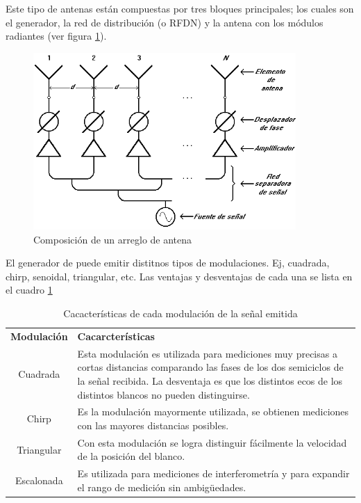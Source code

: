 Este tipo de antenas están compuestas por tres bloques principales; los cuales son el generador, la red de distribución (o RFDN) y la 
antena con los módulos radiantes (ver figura \ref{fig:compositionAntenna}).

\begin{figure}[H]
 \centering
 \includegraphics[width=10cm]{gfx/CompositionAntenna.png}
 \caption{Composición de un arreglo de antena}
 \label{fig:compositionAntenna}
\end{figure}

El generador de puede emitir distitnos tipos de modulaciones. Ej, cuadrada, chirp, senoidal, triangular, etc. Las ventajas y
desventajas de cada una se lista en el cuadro \ref{tab:modulations}

\begin{table}[H]
  \footnotesize
  \centering
  \begin{tabular}{|c|p{9cm}|}
	\hline
	\textbf{Modulación} & \textbf{Cacarcterísticas} \\
	Cuadrada & Esta modulación es utilizada para mediciones muy precisas a cortas distancias comparando las fases de los dos 
	semiciclos de la señal recibida. La desventaja es que los distintos ecos de los distintos blancos no pueden distinguirse.\\\hline
	Chirp & Es la modulación mayormente utilizada, se obtienen mediciones con las mayores distancias posibles.\\\hline
	Triangular & Con esta modulación se logra distinguir fácilmente la velocidad de la posición del blanco. \\\hline
	Escalonada & Es utilizada para mediciones de interferometría y para expandir el rango de medición sin ambig\"uedades.\\\hline
  \end{tabular}
  \caption{Cacacterísticas de cada modulación de la señal emitida}
  \label{tab:modulations}
\end{table}

